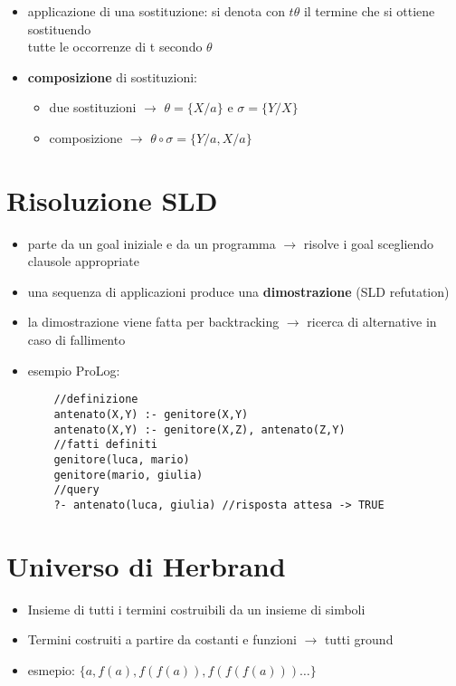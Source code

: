 \documentclass[12pt]{extarticle}
\begin{document}
\begin{itemize}
\begin{itemize}
    \item applicazione di una sostituzione: si denota con $t\theta$ il termine che si ottiene sostituendo \\
          tutte le occorrenze di t secondo $\theta$
    \item \textbf{composizione} di sostituzioni:
    \begin{itemize}
      \item due sostituzioni $\rightarrow$ $\theta = \{X/a\}$ e $\sigma = \{Y/X\}$
      \item composizione $\rightarrow$ $\theta \circ \sigma = \{Y/a, X/a\}$
    \end{itemize}
  \end{itemize}
\end{itemize}

\section*{Risoluzione SLD}
\begin{itemize}
  \item parte da un goal iniziale e da un programma $\rightarrow$ risolve i goal scegliendo clausole appropriate
  \item una sequenza di applicazioni produce una \textbf{dimostrazione} (SLD refutation)
  \item la dimostrazione viene fatta per backtracking $\rightarrow$ ricerca di alternative in caso di fallimento
  \item esempio ProLog:
  \begin{lstlisting}
    //definizione
    antenato(X,Y) :- genitore(X,Y)
    antenato(X,Y) :- genitore(X,Z), antenato(Z,Y)
    //fatti definiti
    genitore(luca, mario)
    genitore(mario, giulia)
    //query
    ?- antenato(luca, giulia) //risposta attesa -> TRUE
  \end{lstlisting}
\end{itemize}

\newpage

\section*{Universo di Herbrand}
\begin{itemize}
  \item Insieme di tutti i termini costruibili da un insieme di simboli
  \item Termini costruiti a partire da costanti e funzioni $\rightarrow$ tutti ground
  \item esmepio: $\{a, f(a), f(f(a)), f(f(f(a))) \dots\}$
\end{itemize}
\end{document}
